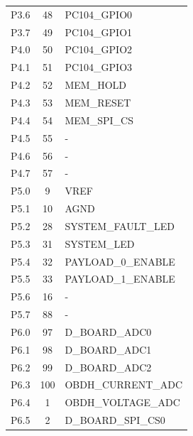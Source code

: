 \begin{longtable}{lcl}
    P3.6              & 48                  & PC104\_GPIO0          \\
    P3.7              & 49                  & PC104\_GPIO1          \\
    \midrule
    P4.0              & 50                  & PC104\_GPIO2          \\
    P4.1              & 51                  & PC104\_GPIO3          \\
    P4.2              & 52                  & MEM\_HOLD             \\
    P4.3              & 53                  & MEM\_RESET            \\
    P4.4              & 54                  & MEM\_SPI\_CS          \\
    P4.5              & 55                  & -                     \\
    P4.6              & 56                  & -                     \\
    P4.7              & 57                  & -                     \\
    \midrule
    P5.0              & 9                   & VREF                  \\
    P5.1              & 10                  & AGND                  \\
    P5.2              & 28                  & SYSTEM\_FAULT\_LED    \\
    P5.3              & 31                  & SYSTEM\_LED           \\
    P5.4              & 32                  & PAYLOAD\_0\_ENABLE    \\
    P5.5              & 33                  & PAYLOAD\_1\_ENABLE    \\
    P5.6              & 16                  & -                     \\
    P5.7              & 88                  & -                     \\
    \midrule
    P6.0              & 97                  & D\_BOARD\_ADC0        \\
    P6.1              & 98                  & D\_BOARD\_ADC1        \\
    P6.2              & 99                  & D\_BOARD\_ADC2        \\
    P6.3              & 100                 & OBDH\_CURRENT\_ADC    \\
    P6.4              & 1                   & OBDH\_VOLTAGE\_ADC    \\
    P6.5              & 2                   & D\_BOARD\_SPI\_CS0    \\

\end{longtable}
